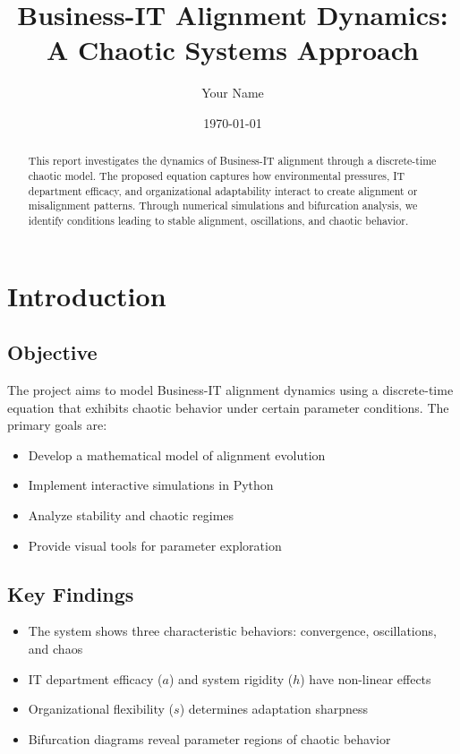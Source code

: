 \documentclass[a4paper, 12pt]{article}
\title{Business-IT Alignment Dynamics: A Chaotic Systems Approach}
\author{Your Name}
\date{\today}
\begin{document}
\maketitle

\begin{abstract}
	This report investigates the dynamics of Business-IT alignment through a discrete-time chaotic model. The proposed equation captures how environmental pressures, IT department efficacy, and organizational adaptability interact to create alignment or misalignment patterns. Through numerical simulations and bifurcation analysis, we identify conditions leading to stable alignment, oscillations, and chaotic behavior.
\end{abstract}

\tableofcontents

\section{Introduction}
\subsection{Objective}
The project aims to model Business-IT alignment dynamics using a discrete-time equation that exhibits chaotic behavior under certain parameter conditions. The primary goals are:

\begin{itemize}
	\item Develop a mathematical model of alignment evolution
	\item Implement interactive simulations in Python
	\item Analyze stability and chaotic regimes
	\item Provide visual tools for parameter exploration
\end{itemize}

\subsection{Key Findings}
\begin{itemize}
	\item The system shows three characteristic behaviors: convergence, oscillations, and chaos
	\item IT department efficacy ($a$) and system rigidity ($h$) have non-linear effects
	\item Organizational flexibility ($s$) determines adaptation sharpness
	\item Bifurcation diagrams reveal parameter regions of chaotic behavior
\end{itemize}
\end{document}
